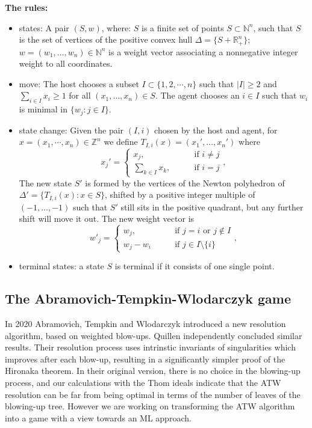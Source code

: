 \documentclass{article}
\theoremstyle{plain}
\theoremstyle{definition}
\theoremstyle{remark}
\begin{document}
\textbf{The rules:}
\begin{itemize}
\item states: A pair $(S,w)$, where: $S$ is a finite set of points $S \subset \mathbb{N}^n$, such that $S$ is the set of 
vertices of the positive convex hull $\Delta=\{S+\mathbb{R}^n_+\}$; $w=(w_1,\ldots, w_n)\in \mathbb{N}^n$ is a weight 
vector associating a nonnegative integer weight to all coordinates.
\item move: The host chooses a subset $I\subset \{1,2,\cdots, n\}$ such that $|I|\geq 2$ and 
$\sum_{i\in I}x_i\ge 1$ for all $(x_1,\ldots, x_n)\in S$.
The agent chooses an $i\in I$ such that $w_i$ is minimal in $\{w_j: j\in I\}$.
\item state change: Given the pair $(I,i)$ chosen by the host and agent, for $x=(x_1,\cdots,x_n)\in \mathbb Z^n$ we define
$T_{I,i}(x)=(x_1',\ldots, x_n')$ where 
$$x_j' = \begin{cases}x_j, &\qquad\text{if } i\neq j \\ \sum\limits_{k\in I} x_k, &\qquad\text{if } i=j
\end{cases},$$
The new state $S'$ is formed by the vertices of the Newton polyhedron of $\Delta'=\{T_{I,i}(x):x\in S\}$, shifted by
a positive integer multiple of $(-1,\ldots, -1)$ such that $S'$ still sits in the positive quadrant, but any
further shift will move it out. 
The new weight vector is 
$$w'_j=\begin{cases}w_j, &\qquad\text{if } j=i \text{ or } j\notin I \\ w_j-w_i &\qquad\text{if } j \in I\setminus \{i\}
\end{cases},$$
\item terminal states: a state $S$ is terminal if it consists of one single point. 
\end{itemize}

\subsection{The Abramovich-Tempkin-Wlodarczyk game}

In 2020 Abramovich, Tempkin and Wlodarczyk \cite{atv} introduced a new resolution algorithm, based on weighted blow-ups. Quillen \cite{quillen} independently concluded similar results. Their resolution process uses intrinstic invariants of singularities which improves after each blow-up, resulting in a significantly simpler proof of the Hironaka theorem. In their original version, there is no choice in the blowing-up process, and our calculations with the Thom ideals indicate that the ATW resolution can be far from being optimal in terms of the number of leaves of the blowing-up tree. However we are working on transforming the ATW algorithm  into a game with a view towards an ML approach. 
\end{document}
